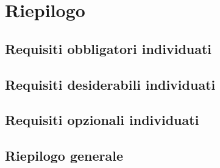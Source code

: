 \section{Riepilogo}

\subsection{Requisiti obbligatori individuati}

\subsection{Requisiti desiderabili individuati}

\subsection{Requisiti opzionali individuati}

\subsection{Riepilogo generale}
